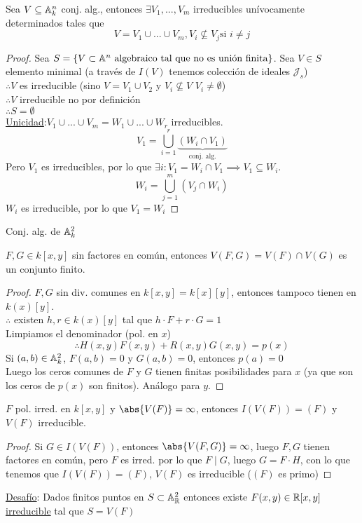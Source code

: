 \begin{thm}
    Sea $V\subseteq\mathbb{A}_k^n$ conj. alg., entonces $\exists V_1,...,V_m$ irreducibles unívocamente determinados tales que
    \[
        V=V_1\cup...\cup V_m, V_i\nsubseteq V_j\text{si }i\neq j
    \]
\end{thm}

\begin{proof}
    Sea $S=\{V\subset\mathbb{A}^n\text{ algebraico tal que no es unión finita}\}$. Sea $V\in S$ elemento minimal (a través de $I(V)$ tenemos colección de ideales $\mathcal{J}_s$)\\
    $\therefore V$ es irreducible (sino $V=V_1\cup V_2$ y $V_i\nsubseteq V$ $V_i\neq\emptyset$)\\
    $\therefore V$ irreducible no por definición\\
    $\therefore S=\emptyset$\\
    \underline{Unicidad}:$V_1\cup...\cup V_m=W_1\cup...\cup W_r$ irreducibles.
    \[
        V_1=\bigcup_{i=1}^r\underbrace{(W_i\cap V_1)}_\text{conj. alg.}
    \]
    Pero $V_1$ es irreducibles, por lo que $\exists i: V_1=W_i\cap V_1\implies V_1\subseteq W_i$.
    \[
        W_i=\bigcup_{j=1}^m(V_j\cap W_i)
    \]
    $W_i$ es irreducible, por lo que $V_1=W_i$
\end{proof}

Conj. alg. de $\mathbb{A}_k^2$
\begin{prop}
    $F,G\in k[x,y]$ sin factores en común, entonces $V(F,G)=V(F)\cap V(G)$ es un conjunto finito.
\end{prop}

\begin{proof}
    $F,G$ sin div. comunes en $k[x,y]=k[x][y]$, entonces tampoco tienen en $k(x)[y]$.\\
    $\therefore$ existen $h,r\in k(x)[y]$ tal que $h\cdot F+r\cdot G=1$\\
    Limpiamos el denominador (pol. en $x$)
    \[
        \therefore H(x,y)F(x,y)+R(x,y)G(x,y)=p(x)
    \]
    Si $(a,b)\in\mathbb{A}_k^2$, $F(a,b)=0$ y $G(a,b)=0$, entonces $p(a)=0$\\
    Luego los ceros comunes de $F$ y $G$ tienen finitas posibilidades para $x$ (ya que son los ceros de $p(x)$ son finitos). Análogo para $y$.
\end{proof}

\begin{cor}
    $F$ pol. irred. en $k[x,y]$ y $\abs{V(F)}=\infty$, entonces $I(V(F))=(F)$ y $V(F)$ irreducible.
\end{cor}
\begin{proof}
    Si $G\in I(V(F))$, entonces $\abs{V(F,G)}=\infty$, luego $F,G$ tienen factores en común, pero $F$ es irred. por lo que $F\mid G$, luego $G=F\cdot H$, con lo que tenemos que $I(V(F))=(F)$, $V(F)$ es irreducible ($(F)$ es primo)
\end{proof}

\underline{Desafío}: Dados finitos puntos en $S\subset\mathbb{A}_{\mathbb{R}}^2$ entonces existe $F(x,y)\in \mathbb{R}[x,y]$ \underline{irreducible} tal que $S=V(F)$

